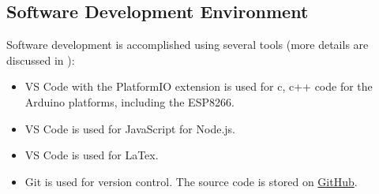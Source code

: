 \subsection{Software Development Environment}
Software development is accomplished using several tools (more details are discussed in ):
\begin{itemize}
\item \ac{VS Code} with the PlatformIO extension is used for c, c++ code for the Arduino platforms, including the ESP8266.
\item \ac{VS Code} is used for JavaScript for Node.js.
\item \ac{VS Code} is used for LaTex.
\item Git is used for version control. The source code is stored on \href{https://github.com/djbristow/RAILS}{GitHub}.
\end{itemize}
